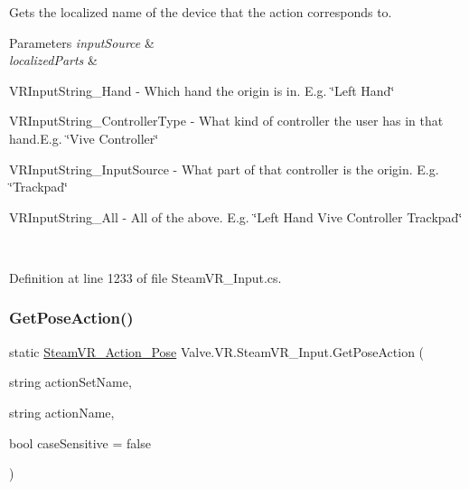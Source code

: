 Gets the localized name of the device that the action corresponds to. 


\begin{DoxyParams}{Parameters}
{\em input\+Source} & \\
\hline
{\em localized\+Parts} & 
\begin{DoxyItemize}
\item V\+R\+Input\+String\+\_\+\+Hand -\/ Which hand the origin is in. E.\+g. \char`\"{}\+Left Hand\char`\"{} 
\item V\+R\+Input\+String\+\_\+\+Controller\+Type -\/ What kind of controller the user has in that hand.\+E.\+g. \char`\"{}\+Vive Controller\char`\"{} 
\item V\+R\+Input\+String\+\_\+\+Input\+Source -\/ What part of that controller is the origin. E.\+g. \char`\"{}\+Trackpad\char`\"{} 
\item V\+R\+Input\+String\+\_\+\+All -\/ All of the above. E.\+g. \char`\"{}\+Left Hand Vive Controller Trackpad\char`\"{} 
\end{DoxyItemize}\\
\hline
\end{DoxyParams}


Definition at line 1233 of file Steam\+V\+R\+\_\+\+Input.\+cs.

\mbox{\label{class_valve_1_1_v_r_1_1_steam_v_r___input_a356eb935355089208399a963fe717b66}} 
\subsubsection{\texorpdfstring{GetPoseAction()}{GetPoseAction()}\hspace{0.1cm}{\footnotesize\ttfamily [1/2]}}
{\footnotesize\ttfamily static \mbox{\hyperlink{class_valve_1_1_v_r_1_1_steam_v_r___action___pose}{Steam\+V\+R\+\_\+\+Action\+\_\+\+Pose}} Valve.\+V\+R.\+Steam\+V\+R\+\_\+\+Input.\+Get\+Pose\+Action (\begin{DoxyParamCaption}\item[{string}]{action\+Set\+Name,  }\item[{string}]{action\+Name,  }\item[{bool}]{case\+Sensitive = {\ttfamily false} }\end{DoxyParamCaption})\hspace{0.3cm}{\ttfamily [static]}}



